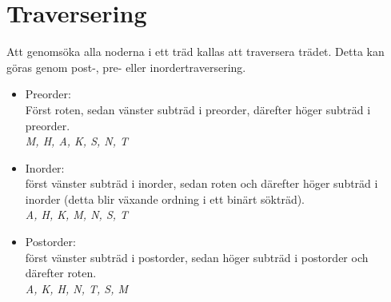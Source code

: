 \documentclass[11pt]{article}
\begin{document}
\section{Traversering}
Att genomsöka alla noderna i ett träd kallas att traversera trädet. Detta kan göras genom post-, pre- eller inordertraversering.
\begin{figure}[h]
  \begin{center}
  \end{center}
  \label{bild1}
\end{figure}
\begin{itemize}
\item{Preorder: \\
	Först roten, sedan vänster subträd i preorder, därefter höger subträd i preorder. \\
	\emph{M, H, A, K, S, N, T}} 
\item{Inorder: \\
	först vänster subträd i inorder, sedan roten och därefter höger subträd i inorder (detta blir växande ordning i ett binärt sökträd). \\
	\emph{A, H, K, M, N, S, T}}
\item{Postorder: \\
	först vänster subträd i postorder, sedan höger subträd i postorder och därefter roten. \\
	\emph{A, K, H, N, T, S, M}}
\end{itemize}
\end{document}
